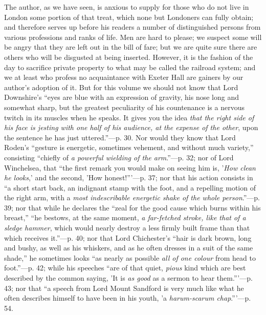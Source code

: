 The author,
as we have seen, is anxious to supply for those who do not live in
London some portion of that treat, which none but
Londoners can fully obtain; and therefore serves up before his readers a
number of distinguished persons from various professions and ranks of
life. Men are hard to please; we suspect some will be angry that they are
left out in the bill of fare; but we are quite sure there are others who
will be disgusted at being inserted. However, it is the fashion of the
day to sacrifice private property to what may be called the railroad
system; and we at least who profess no acquaintance with Exeter Hall are
gainers by our author's adoption of it. But for this volume we should
not know that Lord Downshire's ``eyes are blue with an expression of
gravity, his nose long and somewhat sharp, but the greatest peculiarity
of his countenance is a nervous twitch in its muscles when he speaks. It
gives you the idea \emph{that the right side of his face is jesting with
one half of his audience, at the expense of the other}, upon the
sentence he has just uttered.''—p. 30. Nor would they know that Lord
Roden's ``gesture is energetic, sometimes vehement, and without much
variety,'' consisting ``chiefly of \emph{a powerful wielding of the arm}.''—p.
32; nor of Lord Winchelsea, that ``the first remark you would make on
seeing him is, '\emph{How clean he looks},' and the second, 'How
honest!'''—p. 37; nor that his action consists in ``a short start
back, an indignant stamp with the foot, and a repelling motion of the
right arm, with a \emph{most indescribable energetic shake of the whole
person}.''—p. 39; nor that while he declares the ``zeal for the
good cause which burns within his breast,'' ``he bestows, at the same
moment, \emph{a far-fetched stroke, like that of a sledge hammer}, which
would nearly destroy a less firmly built frame than that which receives
it.''—p. 40; nor that Lord Chichester's ``hair is dark brown, long
and bushy, as well as his whiskers, and as he often dresses in a suit of
the same shade,'' he sometimes looks ``as nearly as possible \emph{all of
one colour} from head to foot.''—p. 42; while his speeches ``are
of that quiet, \emph{pious} kind which are best described by the common
saying, 'It is \emph{as good} as a sermon to hear them.'''—p. 43;
nor that ``a speech from Lord Mount Sandford is very much like what he
often describes himself to have been in his youth, 'a \emph{harum-scarum
chap}.'''—p. 54.

